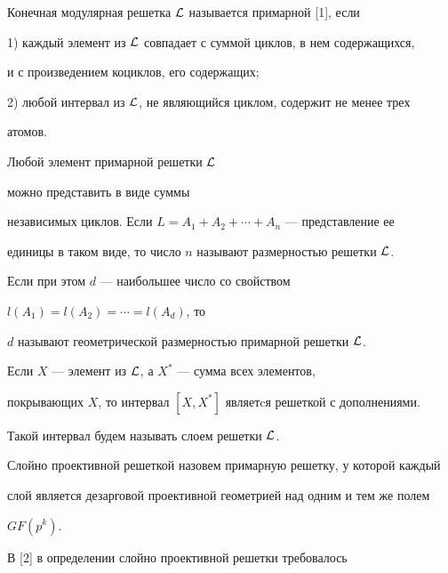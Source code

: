 

\maketitle


\label{begin}








Конечная модулярная решетка $\cal L$ называется примарной [1], если





1) каждый элемент из $\cal L$ совпадает с суммой циклов, в нем содержащихся,


и с произведением коциклов, его содержащих;





2) любой интервал из $\cal L$, не являющийся циклом, содержит не менее трех


атомов.





\noindent{}Любой элемент примарной решетки $\cal L$


можно представить в виде суммы


независимых циклов. Если $L = A_1+A_2+\dotsb+A_n$ --- представление ее


единицы в таком виде, то число $n$ называют размерностью решетки $\cal L$.


Если при этом $d$ --- наибольшее число со свойством


$l(A_1) = l(A_2) = \dotsb= l(A_d)$, то


$d$ называют геометрической размерностью примарной решетки $\cal L$.


Если $X$ --- элемент из $\cal L$, а $X^*$ --- сумма всех элементов,


покрывающих $X$, то интервал $[X,X^*]$ являетcя решеткой с дополнениями.


Такой интервал будем называть слоем решетки $\cal L$.


Слойно проективной решеткой назовем примарную решетку, у которой каждый


слой является дезарговой проективной геометрией над одним и тем же полем


$GF(p^k)$.





В [2] в определении слойно проективной решетки требовалось


